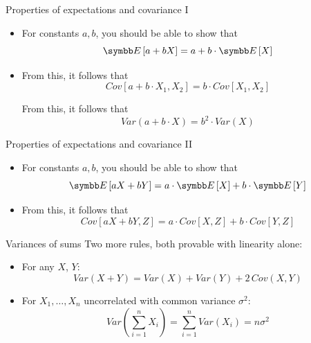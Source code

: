 \documentclass[aspectratio=169,11pt]{beamer}
\begin{document}
\begin{frame}{Properties of expectations and covariance I}
\begin{itemize}
	\item For constants $a,b$, you should be able to show that\[
		\E\left[ a + b X\right] = a + b \cdot \E\left[ X\right] 
	\]

	\medskip
	\item From this, it follows that\[
		Cov\left[ a + b \cdot X_1 , X_2 \right] = b \cdot Cov\left[X_1 , X_2 \right] 
	\]

	\medskip From this, it follows that\[
			Var\left(a + b \cdot X\right) = b^2 \cdot Var\left( X\right) 
	\]
\end{itemize}
\end{frame}


\begin{frame}{Properties of expectations and covariance II}
\begin{itemize}
	\item For constants $a,b$, you should be able to show that\[
		\E\left[ a X + b Y\right] = a  \cdot \E\left[ X\right] + b \cdot \E\left[ Y\right]
	\]

	\medskip
	\item From this, it follows that\[
		Cov\left[ a X + b Y, Z \right] = a \cdot Cov\left[X , Z\right] + b \cdot Cov\left[Y , Z\right]
	\]
\end{itemize}
\end{frame}


\begin{frame}{Variances of sums}
Two more rules, both provable with linearity alone:
\begin{itemize}
	\item For any $X$, $Y$:\[
		Var\left(X + Y\right) = Var\left(X\right) + Var\left(Y\right) + 2\, Cov\left(X,Y\right)
	\]

	\medskip
	\item For $X_1,\dots,X_n$ \alert{uncorrelated} with common variance $\sigma^2$:\[
		Var\left(\sum_{i=1}^n X_i \right) = \sum_{i=1}^n Var\left(X_i\right) = n \sigma^2
	\]
\end{itemize}
\end{frame}
\end{document}
